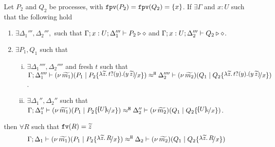



\begin{lemma}
	\label{app:lem:subst_equiv}
	Let $P_2$ and $Q_2$ be processes, with $\mathtt{fpv}(P_2) = \mathtt{fpv}(Q_2) = \{x\}$.
	If $\exists \Gamma$ and $x: U$ such that the following hold
%
	\begin{enumerate}
		\item	$\exists \Delta_1''', \Delta_2''',$ such that
				$\Gamma; x: U; \Delta_1''' \vdash P_2 \triangleright \diamond$ and $\Gamma; x: U; \Delta_2''' \vdash Q_2 \triangleright \diamond$.
		\item	$\exists P_1, Q_1$ such that
		\begin{enumerate}[i.]
			\item	$\exists \Delta_1'''', \Delta_2''''$ and fresh $t$ such that
					$\horel{\Gamma}{\Delta_1''''}{\newsp{\widetilde{m_1}}{P_1 \Par P_2 \subst{\auxtr{t}}{x}}}
					{\hwb}
					{\Delta_2''''}{\newsp{\widetilde{m_2}}{Q_1 \Par Q_2 \subst{\auxtr{t}}{x}}}$.

			\item	$\exists \Delta_1'', \Delta_2''$ such that
					$\horel{\Gamma}{\Delta_1''}{\newsp{\widetilde{m_1}}{P_1 \Par P_2 \subst{\omapchar{U}}{x}}}
					{\hwb}{\Delta_2''}{\newsp{\widetilde{m_2}}{Q_1 \Par Q_2 \subst{\omapchar{U}}{x}}}$.
		\end{enumerate}
	\end{enumerate}
%
	then $\forall R$ such that $\mathtt{fv}(R) = \widetilde{z}$
\[
	\horel{\Gamma}{\Delta_1}{\newsp{\widetilde{m_1}}{P_1 \Par P_2 \subst{\abs{\widetilde{z}}{R}}{x}}}
	{\hwb}
	{\Delta_2}{\newsp{\widetilde{m_2}}{Q_1 \Par Q_2 \subst{\abs{\widetilde{z}}{R}}{x}}}
\]
\end{lemma}

